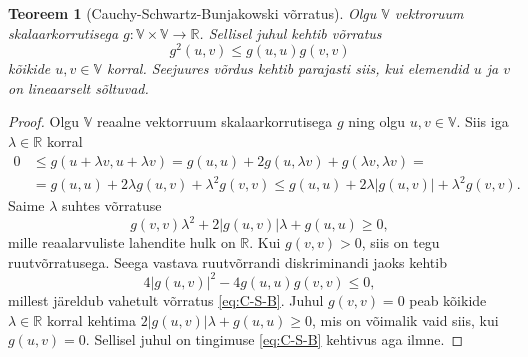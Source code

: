 \documentclass[a4paper,12pt]{article}
\theoremstyle{plain}
\newtheorem{teoreem}{Teoreem}[section]
\theoremstyle{definition}
\numberwithin{equation}{section}
\begin{document}
\begin{teoreem}[Cauchy-Schwartz-Bunjakowski võrratus] \textnormal{\cite[teoreem II.1.1.]{FA2}} \label{teoreem:C-S-B}
Olgu $\mathbb{V}$ vektroruum skalaarkorrutisega $g : \mathbb{V} \times \mathbb{V} \rightarrow \mathbb{R}$. Sellisel juhul kehtib võrratus
\begin{equation} \label{eq:C-S-B}
g^2 \left(u, v \right) \leq g \left(u, u \right) g \left(v, v \right)
\end{equation}
kõikide $u, v \in \mathbb{V}$ korral. Seejuures võrdus kehtib parajasti siis, kui elemendid $u$ ja $v$ on lineaarselt sõltuvad.
\end{teoreem}

\begin{proof}
Olgu $\mathbb{V}$ reaalne vektorruum skalaarkorrutisega $g$ ning olgu $u, v \in \mathbb{V}$. Siis iga $\lambda \in \mathbb{R}$ korral
\begin{align*}
0 &\leq g\left(u+\lambda v,u+\lambda v\right) = g\left(u,u\right) + 2g\left(u, \lambda v \right) + g\left(\lambda v, \lambda v\right) = \\
&= g\left(u,u\right) + 2\lambda g\left(u, v \right) + \lambda^2 g\left(v,v\right) \leq g\left(u,u\right) + 2\lambda | g\left(u, v \right)| + \lambda^2 g\left(v,v\right).
\end{align*}
Saime $\lambda$ suhtes võrratuse
\begin{equation*}
g\left(v,v\right)\lambda^2 + 2|g\left(u, v \right)|\lambda + g\left(u,u\right) \geq 0,
\end{equation*}
mille reaalarvuliste lahendite hulk on $\mathbb{R}$. Kui $g\left(v,v\right) > 0$, siis on tegu ruut\-võrratusega. Seega vastava ruutvõrrandi diskriminandi jaoks kehtib
\begin{equation*}
4|g\left(u,v\right)|^2 - 4g\left(u,u\right)g\left(v,v\right) \leq 0,
\end{equation*}
millest järeldub vahetult võrratus \ref{eq:C-S-B}. Juhul $g\left(v,v\right) = 0$ peab kõikide $\lambda \in \mathbb{R}$ korral kehtima $2|g\left(u,v\right)|\lambda + g\left(u,u\right) \geq 0$, mis on võimalik vaid siis, kui $g\left(u,v\right) = 0$. Sellisel juhul on tingimuse \ref{eq:C-S-B} kehtivus aga ilmne.

\end{proof}
\end{document}
